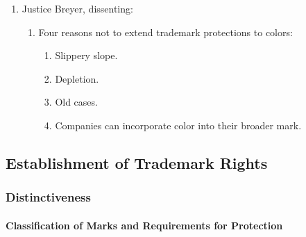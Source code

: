 \begin{enumerate}
\begin{enumerate}
\begin{enumerate}
            \enquote{affects [its] cost or quality.}''\footnote{Casebook p. 
            779.} Here, if a limited supply of colors would harm competitors, 
            courts would not allow exclusive use of one of the colors as a 
            trademark.
        \end{enumerate}
        \item \emph{Third}: many older cases support its position.
        \begin{enumerate}
            \item No---those were pre--Lanham Act.
        \end{enumerate}
        \item \emph{Fourth}: firms can already use color as part of another 
        trademark or trade dress.
        \begin{enumerate}
            \item A company might have a reason to use a color instead of a 
            word or symbol.
        \end{enumerate}
    \end{enumerate}
    \item Justice Breyer, dissenting:
    \begin{enumerate}
        \item Four reasons not to extend trademark protections to colors:
        \begin{enumerate}
            \item Slippery slope.
            \item Depletion.
            \item Old cases.
            \item Companies can incorporate color into their broader mark.
        \end{enumerate}
    \end{enumerate}
\end{enumerate}

\subsection{Establishment of Trademark Rights}

\subsubsection{Distinctiveness}

\paragraph{Classification of Marks and Requirements for Protection}

